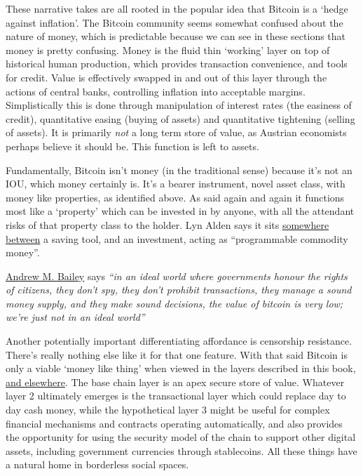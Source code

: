These narrative takes are all rooted in the popular idea that Bitcoin is a `hedge against inflation'. The Bitcoin community seems somewhat confused about the nature of money, which is predictable because we can see in these sections that money is pretty confusing. Money is the fluid thin `working' layer on top of historical human production, which provides transaction convenience, and tools for credit. Value is effectively swapped in and out of this layer through the actions of central banks, controlling inflation into acceptable margins. Simplistically this is done through manipulation of interest rates (the easiness of credit), quantitative easing (buying of assets) and quantitative tightening (selling of assets). It is primarily \textit{not} a long term store of value, as Austrian economists perhaps believe it should be. This function is left to assets.\par 
Fundamentally, Bitcoin isn't money (in the traditional sense) because it's not an IOU, which money certainly is. It's a bearer instrument, novel asset class, with money like properties, as identified above. As said again and again it functions most like a `property' which can be invested in by anyone, with all the attendant risks of that property class to the holder. Lyn Alden says it sits \href{https://www.lynalden.com/what-is-money/}{somewhere between} a saving tool, and an investment, acting as ``programmable commodity money''.\par 
\href{https://andrewmbailey.com/}{Andrew M. Bailey} says \textit{``in an ideal world where governments honour the rights of citizens, they don't spy, they don't prohibit transactions, they manage a sound money supply, and they make sound decisions, the value of bitcoin is very low; we're just not in an ideal world''}\par
Another potentially important differentiating affordance is censorship resistance. There's really nothing else like it for that one feature. With that said Bitcoin is only a viable `money like thing' when viewed in the layers described in this book, \href{https://giacomozucco.com/layers-before-bitcoin}{and elsewhere}\cite{Bhatia2021}. The base chain layer is an apex secure store of value. Whatever layer 2 ultimately emerges is the transactional layer which could replace day to day cash money, while the hypothetical layer 3 might be useful for complex financial mechanisms and contracts operating automatically, and also provides the opportunity for using the security model of the chain to support other digital assets, including government currencies through stablecoins. All these things have a natural home in borderless social spaces.
